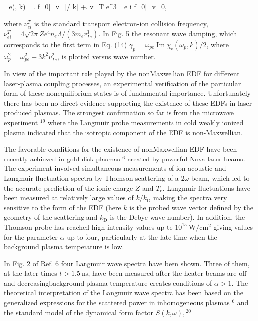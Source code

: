 \documentclass[oneside,onecolumn]{article}
\begin{document}
\begin{sloppypar}
 
  \chi_{e}(\omega, k)=  \left.  \omega f_{0}\right|_{v=|\omega / k|}
 +\left.  v_{T e}^{3} \nu_{e i} f_{0}\right|_{v=0},
 
 where $\nu_{e i}^{T}$ is the standard transport electron-ion collision frequency, $\nu_{e i}^{T}=4 \sqrt{2 \pi} Z e^{4} n_{e} \Lambda /\left(3 m_{e} v_{T e}^{3}\right)$. In Fig. 5 the resonant wave damping, which corresponds to the first term in Eq. (14) $\gamma_{p}=\omega_{p e} \operatorname{Im} \chi_{e}\left(\omega_{p}, k\right) / 2$, where $\omega_{p}^{2}=\omega_{p e}^{2}+3 k^{2} v_{T e}^{2}$, is plotted versus wave number.
 
 In view of the important role played by the nonMaxwellian EDF for different laser-plasma coupling processes, an experimental verification of the particular form of these nonequilibrium states is of fundamental importance. Unfortunately there has been no direct evidence supporting the existence of these EDFs in laser-produced plasmas. The strongest confirmation so far is from the microwave experiment $^{19}$ where the Langmuir probe measurements in cold weakly ionized plasma indicated that the isotropic component of the EDF is non-Maxwellian.
 
 The favorable conditions for the existence of nonMaxwellian EDF have been recently achieved in gold disk plasmas ${ }^{6}$ created by powerful Nova laser beams. The experiment involved simultaneous measurements of ion-acoustic and Langmuir fluctuation spectra by Thomson scattering of a $2 \omega$ beam, which led to the accurate prediction of the ionic charge $Z$ and $T_{e}$. Langmuir fluctuations have been measured at relatively large values of $k / k_{\mathrm{D}}$ making the spectra very sensitive to the form of the EDF (here $k$ is the probed wave vector defined by the geometry of the scattering and $k_{\mathrm{D}}$ is the Debye wave number). In addition, the Thomson probe has reached high intensity values up to $10^{15} \mathrm{~W} / \mathrm{cm}^{2}$ giving values for the parameter $\alpha$ up to four, particularly at the late time when the background plasma temperature is low.
 
 In Fig. 2 of Ref. 6 four Langmuir wave spectra have been shown. Three of them, at the later times $t>1.5 \mathrm{~ns}$, have been measured after the heater beams are off and decreasingbackground plasma temperature creates conditions of $\alpha>1$. The theoretical interpretation of the Langmuir wave spectra has been based on the generalized expressions for the scattered power in inhomogeneous plasmas $^{6}$ and the standard model of the dynamical form factor $S(k, \omega),{ }^{20}$
 

\end{sloppypar}
\end{document}
